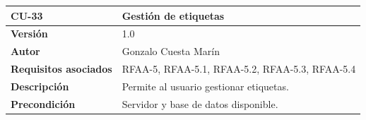 \documentclass[
]{article}
\begin{document}
\begin{longtable}[]{@{}ll@{}}
\toprule
\begin{minipage}[b]{0.20\columnwidth}\raggedright
\textbf{CU-33}\strut
\end{minipage} & \begin{minipage}[b]{0.74\columnwidth}\raggedright
\textbf{Gestión de etiquetas}\strut
\end{minipage}\tabularnewline
\midrule
\endhead
\begin{minipage}[t]{0.20\columnwidth}\raggedright
\textbf{Versión}\strut
\end{minipage} & \begin{minipage}[t]{0.74\columnwidth}\raggedright
1.0\strut
\end{minipage}\tabularnewline
\begin{minipage}[t]{0.20\columnwidth}\raggedright
\textbf{Autor}\strut
\end{minipage} & \begin{minipage}[t]{0.74\columnwidth}\raggedright
Gonzalo Cuesta Marín\strut
\end{minipage}\tabularnewline
\begin{minipage}[t]{0.20\columnwidth}\raggedright
\textbf{Requisitos asociados}\strut
\end{minipage} & \begin{minipage}[t]{0.74\columnwidth}\raggedright
RFAA-5, RFAA-5.1, RFAA-5.2, RFAA-5.3, RFAA-5.4\strut
\end{minipage}\tabularnewline
\begin{minipage}[t]{0.20\columnwidth}\raggedright
\textbf{Descripción}\strut
\end{minipage} & \begin{minipage}[t]{0.74\columnwidth}\raggedright
Permite al usuario gestionar etiquetas.\strut
\end{minipage}\tabularnewline
\begin{minipage}[t]{0.20\columnwidth}\raggedright
\textbf{Precondición}\strut
\end{minipage} & \begin{minipage}[t]{0.74\columnwidth}\raggedright
Servidor y base de datos disponible.


\end{minipage}
\end{longtable}
\end{document}
